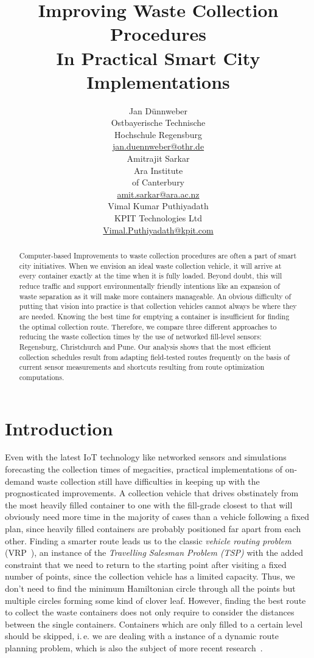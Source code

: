 \documentclass[10pt]{article}
\title{Improving Waste Collection Procedures \\ In Practical Smart City Implementations}
\author{
  Jan D{\"u}nnweber  \\
  Ostbayerische Technische \\ Hochschule Regensburg \\
  {\underline{ jan.duennweber@othr.de} }\\\And 
  Amitrajit Sarkar \\
 Ara Institute \\ of Canterbury \\
  {\underline{amit.sarkar@ara.ac.nz}} \\\And
  Vimal Kumar Puthiyadath \\
 KPIT Technologies Ltd \\
  {\underline{Vimal.Puthiyadath@kpit.com}} 
  }
\date{}
\begin{document}
\maketitle
\begin{abstract}
Computer-based Improvements to waste collection procedures are often a part of smart city 
initiatives. When we envision an ideal waste collection vehicle, it will arrive at every
container exactly at the time when it is fully loaded. Beyond doubt, this will 
reduce traffic and support environmentally friendly intentions like an expansion 
of waste separation as it will make more containers manageable. 
An obvious difficulty of putting that vision into practice is that  
collection vehicles cannot always be where they are needed. 
Knowing the best time for emptying a container is insufficient for 
finding the optimal collection route.
Therefore, we compare three different approaches to reducing the waste collection
times by the use of networked fill-level sensors: Regensburg,
Christchurch and Pune. Our analysis shows that the most efficient collection schedules 
result from adapting field-tested routes frequently on the basis of 
current sensor measurements and shortcuts resulting from route 
optimization computations.
\end{abstract}

\section{Introduction}
Even with the latest IoT technology like networked sensors and simulations
forecasting the collection times of megacities, practical implementations of 
on-demand waste collection still have difficulties in keeping up with the 
prognosticated improvements.
A collection vehicle that drives obstinately from the most heavily filled 
container to one with the fill-grade closest to that will obviously need 
more time in the majority of cases than a vehicle following a fixed plan, 
since heavily filled containers are probably positioned far apart from 
each other. Finding a smarter route leads us to the classic 
{\it vehicle routing problem} (VRP~\cite{Dantzig59}), an instance of the 
{\it Travelling Salesman Problem (TSP)} with the added constraint that we 
need to return to the starting point after visiting a fixed number of points, 
since the collection vehicle has a limited capacity. 
Thus, we don't need to find the minimum Hamiltonian
circle through all the points but multiple circles forming some kind of
clover leaf. However, finding the best route to collect the waste 
containers does not only require to consider the distances between 
the single containers. Containers which are only filled to a certain level should
be skipped, i.\,e. we are dealing with a instance of a dynamic route 
planning problem, which is also the subject of more recent 
research~\cite{Chen16}.
\end{document}
